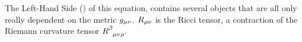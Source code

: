 \documentclass[
  letterpaper,
  DIV=11,
  numbers=noendperiod,
  oneside]{scrreprt}
\begin{document}
The Left-Hand Side () of this equation, contains several objects that
are all only really dependent on the metric
\(\texttip{\texttip{g}{metric tensor}_{{\mu\nu}}}{covariant metric tensor component}\).
\(\texttip{\texttip{R}{Ricci tensor}_{{\mu\nu}}}{covariant Ricci tensor component}\)
is the Ricci tensor, a contraction of the Riemann curvature tensor
\(\texttip{\texttip{R}{Riemann tensor}^{\beta}_{\phantom{\beta}\mu\nu\rho}}{Riemann Tensor tensor component}\).
\end{document}
